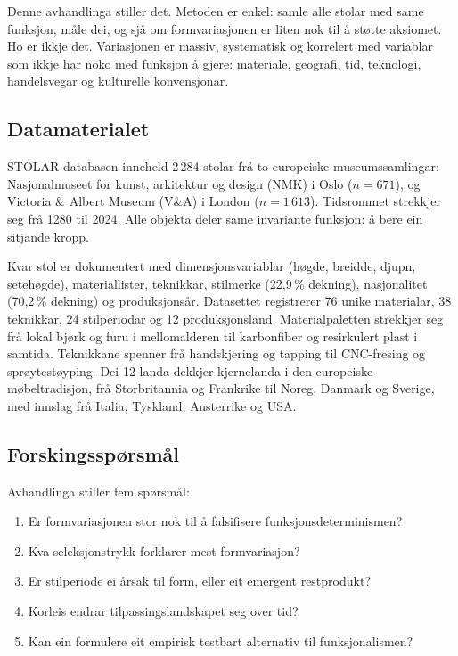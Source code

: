 \documentclass[12pt, a4paper]{article}
\begin{document}
Denne avhandlinga stiller det. Metoden er enkel: samle alle stolar med same funksjon, måle dei, og sjå om formvariasjonen er liten nok til å støtte aksiomet. Ho er ikkje det. Variasjonen er massiv, systematisk og korrelert med variablar som ikkje har noko med funksjon å gjere: materiale, geografi, tid, teknologi, handelsvegar og kulturelle konvensjonar.

\subsection{Datamaterialet}

STOLAR-databasen inneheld 2\,284 stolar frå to europeiske museumssamlingar: Nasjonalmuseet for kunst, arkitektur og design (NMK) i Oslo ($n = 671$), og Victoria \& Albert Museum (V\&A) i London ($n = 1\,613$). Tidsrommet strekkjer seg frå 1280 til 2024. Alle objekta deler same invariante funksjon: å bere ein sitjande kropp.

Kvar stol er dokumentert med dimensjonsvariablar (høgde, breidde, djupn, setehøgde), materiallister, teknikkar, stilmerke (22,9\,\% dekning), nasjonalitet (70,2\,\% dekning) og produksjonsår. Datasettet registrerer 76 unike materialar, 38 teknikkar, 24 stilperiodar og 12 produksjonsland. Materialpaletten strekkjer seg frå lokal bjørk og furu i mellomalderen til karbonfiber og resirkulert plast i samtida. Teknikkane spenner frå handskjering og tapping til CNC-fresing og sprøytestøyping. Dei 12 landa dekkjer kjernelanda i den europeiske møbeltradisjon, frå Storbritannia og Frankrike til Noreg, Danmark og Sverige, med innslag frå Italia, Tyskland, Austerrike og USA.

\subsection{Forskingsspørsmål}

Avhandlinga stiller fem spørsmål:
\begin{enumerate}
  \item Er formvariasjonen stor nok til å falsifisere funksjonsdeterminismen?
  \item Kva seleksjonstrykk forklarer mest formvariasjon?
  \item Er stilperiode ei årsak til form, eller eit emergent restprodukt?
  \item Korleis endrar tilpassingslandskapet seg over tid?
  \item Kan ein formulere eit empirisk testbart alternativ til funksjonalismen?
\end{enumerate}
\end{document}
